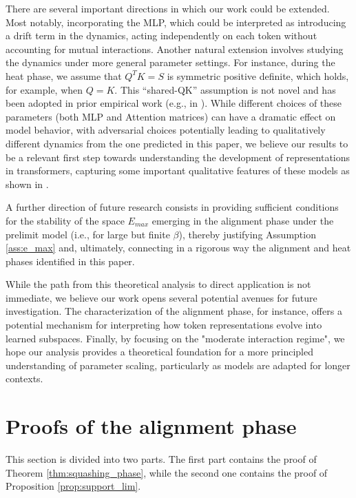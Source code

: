 \documentclass{article}
\numberwithin{theorem}{section}
\begin{document}
 There are several important directions in which our work could be extended. Most notably, incorporating the MLP, which could be interpreted as introducing a drift term in the dynamics, acting independently on each token without accounting for mutual interactions. Another natural extension involves studying the dynamics under more general parameter settings. For instance, during the heat phase, we assume that $Q^TK=S$ is symmetric positive definite, which holds, for example, when $Q=K$. This “shared-QK” assumption is not novel and has been adopted in prior empirical work (e.g., in \cite{kitaev2020reformer}). While different choices of these parameters (both MLP and Attention matrices) can have a dramatic effect on model behavior, with adversarial choices potentially leading to qualitatively different dynamics from the one predicted in this paper, we believe our results to be a relevant first step towards understanding the development of representations in transformers, capturing some important qualitative features of these models as shown in \cite{geshkovski2023mathematical}.
 

 A further direction of future research consists in providing sufficient conditions for the stability of the space $E_{max}$ emerging in the alignment phase under the prelimit model (i.e., for large but finite $\beta$), thereby justifying Assumption \ref{ass:e_max} and, ultimately, connecting in a rigorous way the alignment and heat phases identified in this paper.
 

While the path from this theoretical analysis to direct application is not immediate, we believe our work opens several potential avenues for future investigation. The characterization of the alignment phase, for instance, offers a potential mechanism for interpreting how token representations evolve into learned subspaces. Finally, by focusing on the "moderate interaction regime", we hope our analysis provides a theoretical foundation for a more principled understanding of parameter scaling, particularly as models are adapted for longer contexts.




\medskip


\newpage
\appendix

\section{Proofs of the alignment phase}
This section is divided into two parts. The first part contains the proof of Theorem \ref{thm:squashing_phase}, while the second one contains the proof of Proposition \ref{prop:support_lim}.
\end{document}
